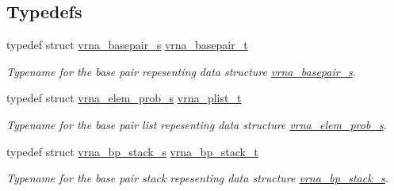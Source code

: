 \subsection*{Typedefs}
\begin{DoxyCompactItemize}
\item 
\mbox{\label{group__data__structures_gac8c5669d3fb813cacf506489689305ce}} 
typedef struct \hyperlink{group__data__structures_structvrna__basepair__s}{vrna\+\_\+basepair\+\_\+s} \hyperlink{group__data__structures_gac8c5669d3fb813cacf506489689305ce}{vrna\+\_\+basepair\+\_\+t}
\begin{DoxyCompactList}\small\item\em Typename for the base pair repesenting data structure \hyperlink{group__data__structures_structvrna__basepair__s}{vrna\+\_\+basepair\+\_\+s}. \end{DoxyCompactList}\item 
\mbox{\label{group__data__structures_ga5bd6f0d16685b1249b7c3b73049dd5dc}} 
typedef struct \hyperlink{group__struct__utils__plist_structvrna__elem__prob__s}{vrna\+\_\+elem\+\_\+prob\+\_\+s} \hyperlink{group__data__structures_ga5bd6f0d16685b1249b7c3b73049dd5dc}{vrna\+\_\+plist\+\_\+t}
\begin{DoxyCompactList}\small\item\em Typename for the base pair list repesenting data structure \hyperlink{group__struct__utils__plist_structvrna__elem__prob__s}{vrna\+\_\+elem\+\_\+prob\+\_\+s}. \end{DoxyCompactList}\item 
\mbox{\label{group__data__structures_gaa651bda42e7692f08cb603cd6834b0ee}} 
typedef struct \hyperlink{group__data__structures_structvrna__bp__stack__s}{vrna\+\_\+bp\+\_\+stack\+\_\+s} \hyperlink{group__data__structures_gaa651bda42e7692f08cb603cd6834b0ee}{vrna\+\_\+bp\+\_\+stack\+\_\+t}
\begin{DoxyCompactList}\small\item\em Typename for the base pair stack repesenting data structure \hyperlink{group__data__structures_structvrna__bp__stack__s}{vrna\+\_\+bp\+\_\+stack\+\_\+s}. \end{DoxyCompactList}\item 
\mbox{\label{group__data__structures_gae4fc91141cc69c6d8eaf1332cb991ecc}} 

\end{DoxyCompactItemize}
